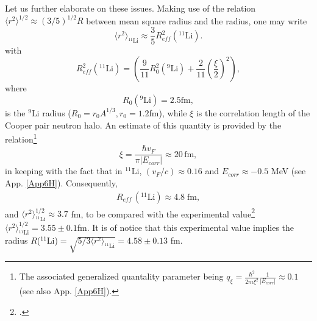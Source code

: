 Let us further elaborate on these issues. Making use of the relation $\langle r^2\rangle^{1/2}\approx (3/5)^{1/2}R$ between mean square radius and the radius, one may write
\begin{equation}\label{eq2.6.9}
\langle r^2\rangle_{^{11}\text{Li}}\approx \frac{3}{5}R_{eff}^2(^{11}\text{Li}).
\end{equation}
 with
\begin{equation}\label{eq2.6.10}
R_{eff}^2(^{11}\text{Li})=\left(\frac{9}{11}R_0^2(^9\text{Li})+\frac{2}{11}\left(\frac{\xi}{2}\right)^2\right),
\end{equation}
where
\begin{equation}
R_0(^9\text{Li})=2.5 \text{fm},
\end{equation}
is the $^9$Li radius ($R_0=r_0A^{1/3}, r_0=1.2$fm), while $\xi$ is the correlation length of the Cooper pair neutron halo. An estimate of this quantity is provided by the relation\footnote{The associated generalized quantality parameter being $q_\xi=\frac{\hbar^2}{2m\xi^2}\frac{1}{|E_{corr}|}\approx0.1$ (see also App. \ref{App6H}). }
 \begin{equation}\label{eq3.6.12}
\xi=\frac{\hbar v_F}{\pi |E_{corr}|}\approx 20 \, \text{fm}, 
 \end{equation}
in keeping with the fact that in $^{11}$Li, $(v_F/c)\approx 0.16$ and $E_{corr}\approx-0.5$ MeV (see App. \ref{App6H}). Consequently, 
\begin{align}\label{eq2.F.5}
R_{eff}\,(^{11}\text{Li})\approx 4.8 \;\text{fm},
\end{align} 
and  $\langle r^2\rangle_{^{11}\text{Li}}^{1/2}\approx 3.7$ fm, to be compared with the experimental value\footnote{\label{f64C3} \cite{Kobayashi:89}.} $\langle r^2\rangle_{^{11}\text{Li}}^{1/2}= 3.55\pm0.1$fm. It is of notice that this experimental value implies  the radius $R$($^{11}$Li)$=\sqrt{5/3\langle r^2\rangle_{^{11}\text{Li}}}=4.58\pm 0.13$ fm.


